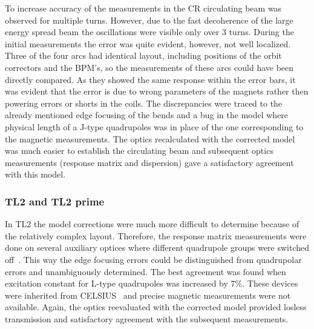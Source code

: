 To increase accuracy of the measurements in the CR circulating beam was observed for multiple turns. 
However, due to the fast decoherence of the large energy spread beam 
the oscillations were visible only over 3 turns. 
During the initial measurements the error was quite evident, however, not well localized.
Three of the four arcs had identical layout, including positions of 
the orbit correctors and the BPM's, so the measurements of these arcs 
could have been directly compared. As they showed the same response 
within the error bars, it was evident that the error is due to wrong parameters
of the magnets rather then powering errors or shorts in the coils.
The discrepancies were traced to the already mentioned edge focusing of the bends and
a bug in the model where physical length of a J-type quadrupoles was in place 
of the one corresponding to the magnetic measurements. 
The optics recalculated with the corrected model was 
much easier to establish the circulating beam and 
subsequent optics measurements (response matrix and dispersion) 
gave a satisfactory agreement with this model.


\subsubsection{TL2 and TL2 prime}

In TL2 the model corrections were much more difficult to determine because 
of the relatively complex layout.
Therefore, the response matrix measurements were done on several auxiliary optices
where different quadrupole groups were switched off~\cite{bib:Jack_PhD}. 
This way the edge focusing errors could be distinguished from 
quadrupolar errors and unambiguously determined. 
The best agreement was found when excitation constant for 
L-type quadrupoles was increased by 7\%. These devices were inherited from 
CELSIUS~\cite{bib:CelsiusMachine} and precise magnetic measurements were not available. 
Again, the optics reevaluated with the corrected model provided 
losless transmission and satisfactory agreement with the subsequent measurements.

